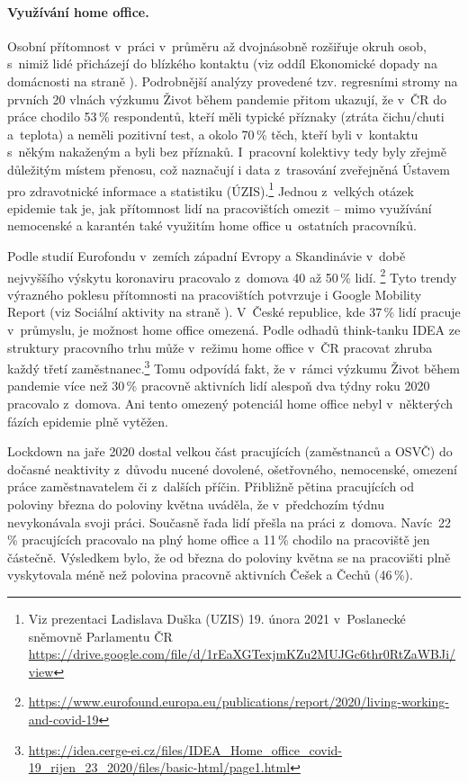 \paragraph{Využívání home office.} Osobní přítomnost v práci v průměru až dvojnásobně rozšiřuje okruh osob, s nimiž lidé přicházejí do blízkého kontaktu (viz oddíl Ekonomické dopady na domácnosti na straně \pageref{Ekonomicke_dopady}). Podrobnější analýzy provedené tzv. regresními stromy na prvních 20 vlnách výzkumu Život během pandemie přitom ukazují, že v ČR do práce chodilo 53\,\% respondentů, kteří měli typické příznaky (ztráta čichu/chuti a teplota) a neměli pozitivní test, a okolo 70\,\% těch, kteří byli v kontaktu s někým nakaženým a byli bez příznaků. I~pracovní kolektivy tedy byly zřejmě důležitým místem přenosu, což naznačují i data z trasování zveřejněná Ústavem pro zdravotnické informace a statistiku (ÚZIS).\footnote{Viz prezentaci Ladislava Duška (UZIS) 19. února 2021 v~Poslanecké sněmovně Parlamentu ČR \url{https://drive.google.com/file/d/1rEaXGTexjmKZu2MUJGc6thr0RtZaWBJi/view}} Jednou z velkých otázek epidemie tak je, jak přítomnost lidí na pracovištích omezit – mimo využívání nemocenské a karantén také využitím home office u~ostatních pracovníků.

Podle studií Eurofondu v zemích západní Evropy a Skandinávie v době nejvyššího výskytu koronaviru pracovalo z domova 40 až 50\,\% lidí. \footnote{ \url{https://www.eurofound.europa.eu/publications/report/2020/living-working-and-covid-19}} Tyto trendy výrazného poklesu přítomnosti na pracovištích potvrzuje i Google Mobility Report (viz Sociální aktivity na straně \pageref{Socialni_aktivity}). V České republice, kde 37\,\% lidí pracuje v průmyslu, je možnost home office omezená. Podle odhadů think-tanku IDEA ze struktury pracovního trhu může v~režimu home office v ČR pracovat zhruba každý třetí zaměstnanec.\footnote{\url{https://idea.cerge-ei.cz/files/IDEA\_Home\_office\_covid-19\_rijen\_23\_2020/files/basic-html/page1.html}} Tomu odpovídá fakt, že v rámci výzkumu Život během pandemie více než 30\,\% pracovně aktivních lidí alespoň dva týdny roku 2020 pracovalo z domova. Ani tento omezený potenciál home office nebyl v některých fázích epidemie plně vytěžen.

Lockdown na jaře 2020 dostal velkou část pracujících (zaměstnanců a OSVČ) do dočasné neaktivity z důvodu nucené dovolené, ošetřovného, nemocenské, omezení práce zaměstnavatelem či z~dalších příčin. Přibližně pětina pracujících od poloviny března do poloviny května uváděla, že v~předchozím týdnu nevykonávala svoji práci. Současně řada lidí přešla na práci z domova. Navíc 22\,\% pracujících pracovalo na plný home office a 11\,\% chodilo na pracoviště jen částečně. Výsledkem bylo, že od března do poloviny května se na pracovišti plně vyskytovala méně než polovina pracovně aktivních Češek a Čechů (46\,\%).

